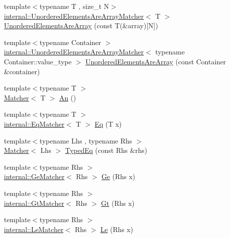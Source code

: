 \begin{DoxyCompactItemize}
\item 
{\footnotesize template$<$typename T , size\+\_\+t N$>$ }\\\hyperlink{classtesting_1_1internal_1_1_unordered_elements_are_array_matcher}{internal\+::\+Unordered\+Elements\+Are\+Array\+Matcher}$<$ T $>$ \hyperlink{namespacetesting_a23c7729cfc61967f3271018076c4b724}{Unordered\+Elements\+Are\+Array} (const T(\&array)\mbox{[}N\mbox{]})
\item 
{\footnotesize template$<$typename Container $>$ }\\\hyperlink{classtesting_1_1internal_1_1_unordered_elements_are_array_matcher}{internal\+::\+Unordered\+Elements\+Are\+Array\+Matcher}$<$ typename Container\+::value\+\_\+type $>$ \hyperlink{namespacetesting_a72b0ee2217293106fcf4971dc4a59f4c}{Unordered\+Elements\+Are\+Array} (const Container \&container)
\item 
{\footnotesize template$<$typename T $>$ }\\\hyperlink{classtesting_1_1_matcher}{Matcher}$<$ T $>$ \hyperlink{namespacetesting_a48792471ff9cdf5b4f95a4242df7bfbb}{An} ()
\item 
{\footnotesize template$<$typename T $>$ }\\\hyperlink{classtesting_1_1internal_1_1_eq_matcher}{internal\+::\+Eq\+Matcher}$<$ T $>$ \hyperlink{namespacetesting_a0cb8ba7eae844c871eccb29e7c81635f}{Eq} (T x)
\item 
{\footnotesize template$<$typename Lhs , typename Rhs $>$ }\\\hyperlink{classtesting_1_1_matcher}{Matcher}$<$ Lhs $>$ \hyperlink{namespacetesting_a57c9aba17aaa27d818e80a1eec81070f}{Typed\+Eq} (const Rhs \&rhs)
\item 
{\footnotesize template$<$typename Rhs $>$ }\\\hyperlink{classtesting_1_1internal_1_1_ge_matcher}{internal\+::\+Ge\+Matcher}$<$ Rhs $>$ \hyperlink{namespacetesting_a42bb19b42d7830b972973a103d5e00f2}{Ge} (Rhs x)
\item 
{\footnotesize template$<$typename Rhs $>$ }\\\hyperlink{classtesting_1_1internal_1_1_gt_matcher}{internal\+::\+Gt\+Matcher}$<$ Rhs $>$ \hyperlink{namespacetesting_a493fc1bafd7b3945ba06ace80e74b0d5}{Gt} (Rhs x)
\item 
{\footnotesize template$<$typename Rhs $>$ }\\\hyperlink{classtesting_1_1internal_1_1_le_matcher}{internal\+::\+Le\+Matcher}$<$ Rhs $>$ \hyperlink{namespacetesting_a2e33596921b80a7fdaff3f62bf18a478}{Le} (Rhs x)

\end{DoxyCompactItemize}
